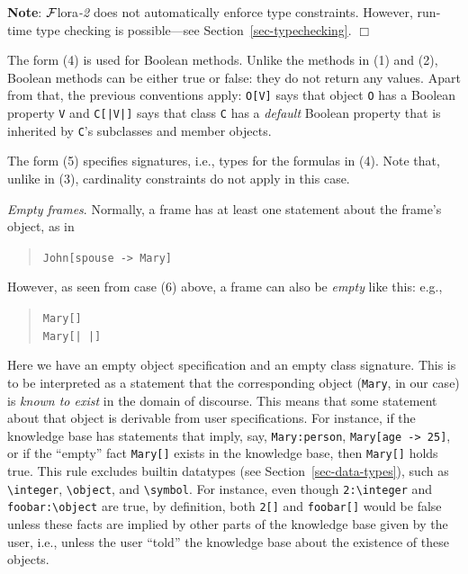 \documentclass[11pt]{article}
\newcommand{\FLORA}{{\mbox{\sc ${\cal F}${lora}\rm\emph{-2}}}\xspace}
\newcommand{\FLSYSTEM}{\FLORA}
\newcommand{\mvd}{{\mbox{\tt \,->\,}}}  %
\newcommand{\bs}{\textbackslash}
\begin{document}
\begin{itemize}
  \noindent
  {\bf Note}: \FLSYSTEM does not automatically enforce type constraints.
  However, run-time type checking is possible---see
  Section~\ref{sec-typechecking}.
  \hfill$\Box$

  The form (4) is used for Boolean methods. Unlike the methods in (1) and
  (2), Boolean methods can be either true or false: they do not return any
  values. Apart from that, the previous conventions apply: \texttt{O[V]}
  says that object \texttt{O} has a Boolean property \texttt{V} and
  \texttt{C[|V|]} says that class \texttt{C} has a \emph{default} Boolean
  property that is inherited by \texttt{C}'s subclasses and member objects.

  The form (5) specifies signatures, i.e., types for the formulas in (4).
  Note that, unlike in (3), cardinality constraints do not apply in this
  case.

  \noindent
  \emph{Empty frames}.
  Normally, a frame has at least one statement about the frame's object,
  as in
  \begin{quote}
   \texttt{John[spouse -> Mary]}
  \end{quote}
  However, as seen from case (6) above, a frame can also be \emph{empty}
  like this:
  e.g., 
  \begin{quote}
   \texttt{Mary[]}  
   \\
   \texttt{Mary[| |]}  
  \end{quote}
  Here we have an empty object specification and an empty class signature.
  This is to be interpreted as a statement that the corresponding object
  (\texttt{Mary}, in our case) is \emph{known to exist} in the domain of
  discourse. This means that
  some statement about that object is derivable from user
  specifications. For instance, if the knowledge base has statements
  that imply, say, \texttt{Mary:person}, \texttt{Mary[age\mvd 25]}, or if
  the ``empty'' fact  \texttt{Mary[]} exists in the knowledge base, then
  \texttt{Mary[]} holds true. This rule excludes builtin datatypes (see
  Section~\ref{sec-data-types}), such as \texttt{\bs{}integer},
  \texttt{\bs{}object}, and \texttt{\bs{}symbol}. For instance, even though
  \texttt{2:\bs{}integer} and \texttt{foobar:\bs{}object} are true, by definition, both
  \texttt{2[]} and \texttt{foobar[]} would be false unless these facts are
  implied by other parts of the knowledge base given by the user, i.e.,
  unless the user ``told'' the knowledge base about the existence of these
  objects.
  

\end{itemize}
\end{document}
